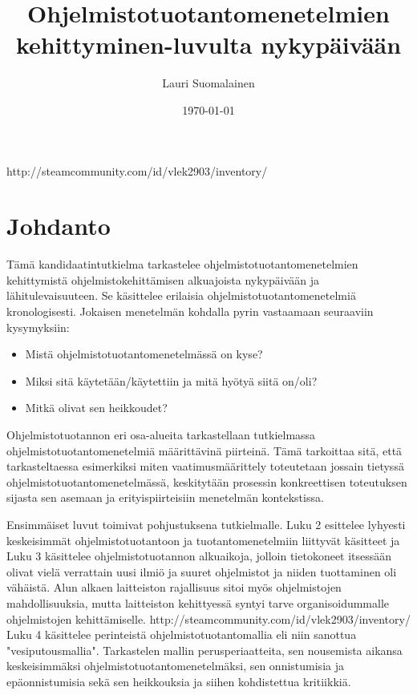 \documentclass[finnish,12pt]{tktltiki2}
\title{Ohjelmistotuotantomenetelmien kehittyminen\newline 1950-luvulta nykypäivään}
\author{Lauri Suomalainen}
\date{\today}
\theoremstyle{definition}
\theoremstyle{remark}
\begin{document}

\frontmatter      %

\maketitle        %
\makeabstract     %

\tableofcontents  %

http://steamcommunity.com/id/vlek2903/inventory/
\mainmatter       %

\section{Johdanto}
\onehalfspacing

Tämä kandidaatintutkielma tarkastelee ohjelmistotuotantomenetelmien kehittymistä ohjelmistokehittämisen alkuajoista nykypäivään ja lähitulevaisuuteen. Se käsittelee erilaisia ohjelmistotuotantomenetelmiä kronologisesti. Jokaisen menetelmän kohdalla pyrin vastaamaan seuraaviin kysymyksiin:

\begin{itemize}
\item Mistä ohjelmistotuotantomenetelmässä on kyse?
\item Miksi sitä käytetään/käytettiin ja mitä hyötyä siitä on/oli?
\item Mitkä olivat sen heikkoudet?
\end{itemize}

Ohjelmistotuotannon eri osa-alueita tarkastellaan tutkielmassa ohjelmistotuotantomenetelmiä määrittävinä piirteinä. Tämä tarkoittaa sitä, että tarkasteltaessa esimerkiksi miten vaatimusmäärittely toteutetaan jossain tietyssä ohjelmistotuotantomenetelmässä, keskitytään prosessin konkreettisen toteutuksen sijasta sen asemaan ja erityispiirteisiin menetelmän kontekstissa.

Ensimmäiset luvut toimivat pohjustuksena tutkielmalle. Luku 2 esittelee lyhyesti keskeisimmät ohjelmistotuotantoon ja tuotantomenetelmiin liittyvät käsitteet ja Luku 3 käsittelee ohjelmistotuotannon alkuaikoja, jolloin tietokoneet itsessään olivat vielä verrattain uusi ilmiö ja suuret ohjelmistot ja niiden tuottaminen oli vähäistä. Alun alkaen laitteiston rajallisuus sitoi myös ohjelmistojen mahdollisuuksia, mutta laitteiston kehittyessä syntyi tarve organisoidummalle ohjelmistojen kehittämiselle.
http://steamcommunity.com/id/vlek2903/inventory/
Luku 4 käsittelee perinteistä ohjelmistotuotantomallia eli niin sanottua "vesiputousmallia". Tarkastelen mallin perusperiaatteita, sen nousemista aikansa keskeisimmäksi ohjelmistotuotantomenetelmäksi, sen onnistumisia ja epäonnistumisia sekä sen heikkouksia ja siihen kohdistettua kritiikkiä.
\end{document}

